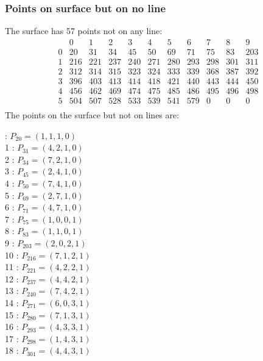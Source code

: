 \documentclass{article}
\begin{document}
{\subsubsection*{Points on surface but on no line}
The surface has 57 points not on any line:\\
$$
\begin{array}{r|*{10}{r}}
 & 0 & 1 & 2 & 3 & 4 & 5 & 6 & 7 & 8 & 9\\
\hline
0 & 20 & 31 & 34 & 45 & 50 & 69 & 71 & 75 & 83 & 203\\
1 & 216 & 221 & 237 & 240 & 271 & 280 & 293 & 298 & 301 & 311\\
2 & 312 & 314 & 315 & 323 & 324 & 333 & 339 & 368 & 387 & 392\\
3 & 396 & 403 & 413 & 414 & 418 & 421 & 440 & 443 & 444 & 450\\
4 & 456 & 462 & 469 & 474 & 475 & 485 & 486 & 495 & 496 & 498\\
5 & 504 & 507 & 528 & 533 & 539 & 541 & 579 & 0 & 0 & 0\\
\end{array}
$$
The points on the surface but not on lines are:\\
\begin{multicols}{2}
 : $P_{20}=( 1, 1, 1, 0 )$\\
1 : $P_{31}=( 4, 2, 1, 0 )$\\
2 : $P_{34}=( 7, 2, 1, 0 )$\\
3 : $P_{45}=( 2, 4, 1, 0 )$\\
4 : $P_{50}=( 7, 4, 1, 0 )$\\
5 : $P_{69}=( 2, 7, 1, 0 )$\\
6 : $P_{71}=( 4, 7, 1, 0 )$\\
7 : $P_{75}=( 1, 0, 0, 1 )$\\
8 : $P_{83}=( 1, 1, 0, 1 )$\\
9 : $P_{203}=( 2, 0, 2, 1 )$\\
10 : $P_{216}=( 7, 1, 2, 1 )$\\
11 : $P_{221}=( 4, 2, 2, 1 )$\\
12 : $P_{237}=( 4, 4, 2, 1 )$\\
13 : $P_{240}=( 7, 4, 2, 1 )$\\
14 : $P_{271}=( 6, 0, 3, 1 )$\\
15 : $P_{280}=( 7, 1, 3, 1 )$\\
16 : $P_{293}=( 4, 3, 3, 1 )$\\
17 : $P_{298}=( 1, 4, 3, 1 )$\\
18 : $P_{301}=( 4, 4, 3, 1 )$\\

\end{multicols}}
\end{document}
